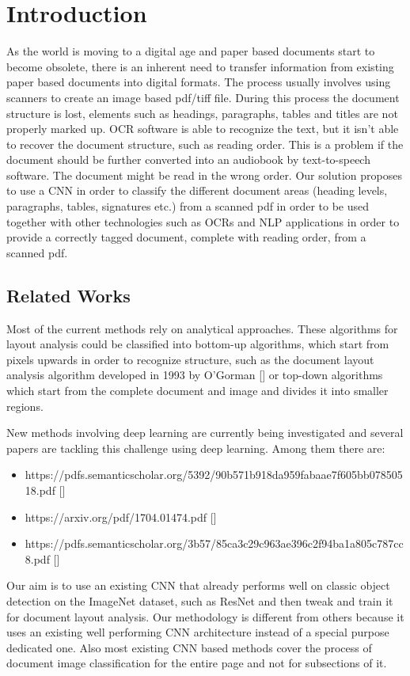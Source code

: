 \documentclass[10pt,twocolumn,letterpaper]{article}
\begin{document}
\section{Introduction}
As the world is moving to a digital age and paper based documents start to become obsolete, there is an inherent need to transfer information from existing paper based documents into digital formats. The process usually involves using scanners to create an image based pdf/tiff file. During this process the document structure is lost, elements such as headings, paragraphs, tables and titles are not properly marked up. OCR software is able to recognize the text, but it isn't able to recover the document structure, such as reading order. This is a problem if the document should be further converted into an audiobook by text-to-speech software. The document might be read in the wrong order. Our solution proposes to use a CNN in order to classify the different document areas (heading levels, paragraphs, tables, signatures etc.) from a scanned pdf in order to be used together with other technologies such as OCRs and NLP applications in order to provide a correctly tagged document, complete with reading order, from a scanned pdf.

\subsection{Related Works}
Most of the current methods rely on analytical approaches. These algorithms for layout analysis could be classified into bottom-up algorithms, which start from pixels upwards in order to recognize structure, such as the document layout analysis algorithm developed in 1993 by O'Gorman [] or top-down algorithms which start from the complete document and image and divides it into smaller regions.

New methods involving deep learning are currently being investigated and several papers are tackling this challenge using deep learning. Among them there are:
\begin{itemize}
	\item https://pdfs.semanticscholar.org/5392/90b571b918da959fabaae7f605bb07850518.pdf []
	\item https://arxiv.org/pdf/1704.01474.pdf []
	\item https://pdfs.semanticscholar.org/3b57/85ca3c29c963ae396c2f94ba1a805c787cc8.pdf []
\end{itemize}

Our aim is to use an existing CNN that already performs well on classic object detection on the ImageNet dataset, such as ResNet and then tweak and train it for document layout analysis. Our methodology is different from others because it uses an existing well performing CNN architecture instead of a special purpose dedicated one. Also most existing CNN based methods cover the process of document image classification for the entire page and not for subsections of it.
\end{document}
